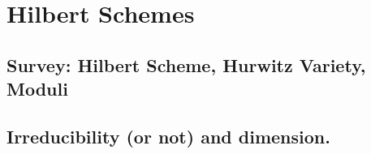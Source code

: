 

\chapter{Hilbert Schemes}
\label{HilbertSchemesChapter}

\section{ Survey: Hilbert Scheme, Hurwitz Variety, Moduli}
\section{Irreducibility (or not) and dimension.} 


